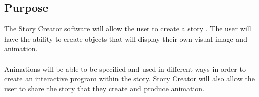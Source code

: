 \documentclass[12pt]{article}
\begin{document}
	\subsection{Purpose}
	The Story Creator software will allow the user to create a story .  The user will have the ability to create objects that will display their own visual image and animation. \\\\ %
	Animations will be able to be specified and used in different ways in order to create an interactive program within the story.  Story Creator will also allow the user to share the story that they create and produce animation.
	
	


\end{document}
